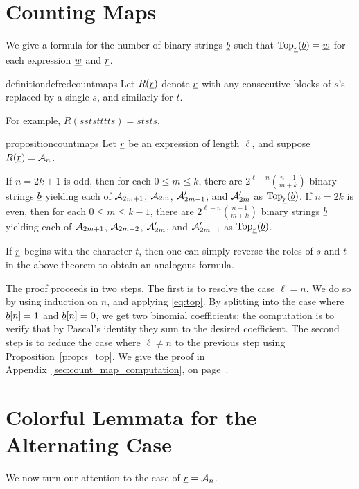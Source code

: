 \section{Counting Maps}
\label{sec:res_count_maps}
We give a formula for the number of binary strings $\ul b$ such that $\Top_{\ul r}(\ul b) = \ul w$ for each expression $\ul w$ and $\ul r$.  

\begin{restatable}{definition}{defredcountmaps}
	Let $R(\ul r)$ denote $\ul r$ with any consecutive blocks of $s$'s replaced by a single $s$, and similarly for $t$.
\end{restatable}
For example, $R(sststttts) = ststs$.

\begin{restatable}{proposition}{countmaps}
	Let $\ul r$ be an expression of length $\ell$, and suppose $R(\ul r) = \AA_n$.
	\begin{enumerate}[(i)]
		\ii If $n=2k+1$ is odd, then for each $0 \le m \le k$, there are $2^{\ell-n} \binom{n-1}{m+k}$ binary strings $\ul b$ yielding each of $\AA_{2m+1}$, $\AA_{2m}$, $\AA_{2m-1}'$, and $\AA_{2m}'$ as $\Top_{\ul r}(\ul b)$.
		\ii If $n=2k$ is even, then for each $0 \le m \le k-1$, there are $2^{\ell-n} \binom{n-1}{m+k}$ binary strings $\ul b$ yielding each of $\AA_{2m+1}$, $\AA_{2m+2}$, $\AA_{2m}'$, and $\AA_{2m+1}'$ as $\Top_{\ul r}(\ul b)$.
	\end{enumerate}
	\label{thm:count_maps}
\end{restatable}
If $\ul r$ begins with the character $t$, then one can simply reverse the roles of $s$ and $t$ in the above theorem to obtain an analogous formula.

The proof proceeds in two steps.  The first is to resolve the case $\ell = n$.  We do so by using induction on $n$, and applying \eqref{eq:top}.  By splitting into the case where $\ul b[n] = 1$ and $\ul b[n] = 0$, we get two binomial coefficients; the computation is to verify that by Pascal's identity they sum to the desired coefficient.
The second step is to reduce the case where $\ell \neq n$ to the previous step using Proposition~\ref{prop:s_top}.  We give the proof in Appendix~\ref{sec:count_map_computation}, on page~\pageref{sec:count_map_computation}.

\section{Colorful Lemmata for the Alternating Case}
\label{sec:res_alt_restrict}
We now turn our attention to the case of $\ul r = \AA_n$.

